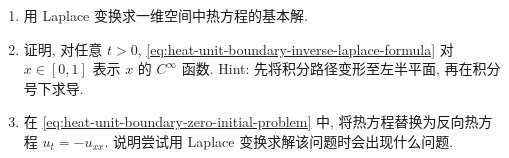 \begin{enumerate}[label=\thesection.\arabic*.,ref=\thesection.\arabic*,start=45,series=book-problems]
\item\label{ex:laplace-one-dimensional-heat-fundamental} 用 Laplace 变换求一维空间中热方程的基本解.

\item\label{ex:laplace-heat-boundary-smoothness} 证明, 对任意 $t>0$, \eqref{eq:heat-unit-boundary-inverse-laplace-formula} 对 $x\in[0,1]$ 表示 $x$ 的 $C^\infty$ 函数. Hint: 先将积分路径变形至左半平面, 再在积分号下求导.

\item\label{ex:backwards-heat-laplace-failure} 在 \eqref{eq:heat-unit-boundary-zero-initial-problem} 中, 将热方程替换为反向热方程 $u_t=-u_{xx}$. 说明尝试用 Laplace 变换求解该问题时会出现什么问题.

\end{enumerate}
